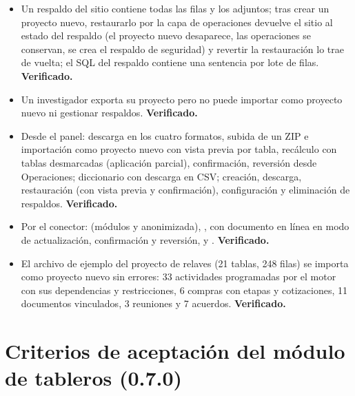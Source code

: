 \documentclass[11pt,a4paper]{article}
\begin{document}
\begin{itemize}
\item Un respaldo del sitio contiene todas las filas y los adjuntos; tras crear un proyecto nuevo, restaurarlo por la capa de operaciones devuelve el sitio al estado del respaldo (el proyecto nuevo desaparece, las operaciones se conservan, se crea el respaldo de seguridad) y revertir la restauración lo trae de vuelta; el SQL del respaldo contiene una sentencia por lote de filas. \textbf{Verificado.}
\item Un investigador exporta su proyecto pero no puede importar como proyecto nuevo ni gestionar respaldos. \textbf{Verificado.}
\item Desde el panel: descarga en los cuatro formatos, subida de un ZIP e importación como proyecto nuevo con vista previa por tabla, recálculo con tablas desmarcadas (aplicación parcial), confirmación, reversión desde Operaciones; diccionario con descarga en CSV; creación, descarga, restauración (con vista previa y confirmación), configuración y eliminación de respaldos. \textbf{Verificado.}
\item Por el conector:  (módulos y anonimizada), ,  con documento en línea en modo de actualización, confirmación y reversión,  y . \textbf{Verificado.}
\item El archivo de ejemplo del proyecto de relaves (21 tablas, 248 filas) se importa como proyecto nuevo sin errores: 33 actividades programadas por el motor con sus dependencias y restricciones, 6 compras con etapas y cotizaciones, 11 documentos vinculados, 3 reuniones y 7 acuerdos. \textbf{Verificado.}
\end{itemize}

\section{Criterios de aceptación del módulo de tableros (0.7.0)}
\end{document}
